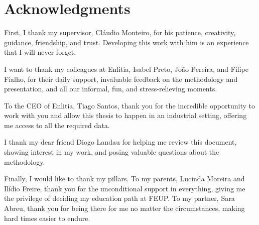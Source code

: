 \chapter*{Acknowledgments}

First, I thank my supervisor, Cláudio Monteiro, for his patience, creativity, guidance, friendship, and trust. Developing this work with him is an experience that I will never forget.

I want to thank my colleagues at Enlitia, Isabel Preto, João Pereira, and Filipe Fialho, for their daily support, invaluable feedback on the methodology and presentation, and all our informal, fun, and stress-relieving moments.

To the CEO of Enlitia, Tiago Santos, thank you for the incredible opportunity to work with you and allow this thesis to happen in an industrial setting, offering me access to all the required data.

I thank my dear friend Diogo Landau for helping me review this document, showing interest in my work, and posing valuable questions about the methodology.

Finally, I would like to thank my pillars. To my parents, Lucinda Moreira and Ilídio Freire, thank you for the unconditional support in everything, giving me the privilege of deciding my education path at FEUP. To my partner, Sara Abreu, thank you for being there for me no matter the circumstances, making hard times easier to endure.

\vspace{10mm}
